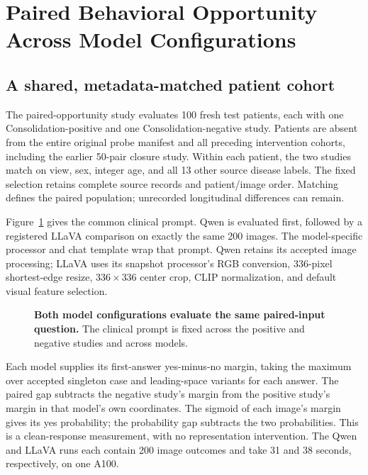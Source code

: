 \clearpage
\section{Paired Behavioral Opportunity Across Model Configurations}
\label{app:paired-opportunity}

\subsection{A shared, metadata-matched patient cohort}

The paired-opportunity study evaluates 100 fresh test patients, each with
one Consolidation-positive and one Consolidation-negative study. Patients
are absent from the entire original probe manifest and all preceding
intervention cohorts, including the earlier 50-pair closure study.
Within each patient, the two studies match on view, sex, integer age, and
all 13 other source disease labels. The fixed selection retains complete
source records and patient/image order. Matching defines the paired
population; unrecorded longitudinal differences can remain.

Figure~\ref{fig:paired-prompt} gives the common clinical prompt. Qwen is
evaluated first, followed by a registered LLaVA comparison on exactly the
same 200 images. The model-specific processor and chat template wrap that
prompt. Qwen retains its accepted image processing; LLaVA uses its snapshot
processor's RGB conversion, 336-pixel shortest-edge resize, $336\times336$
center crop, CLIP normalization, and default visual feature selection.

\begin{figure}[H]
\centering
\begin{minipage}{0.95\linewidth}
\small
{}
\end{minipage}
\caption{\textbf{Both model configurations evaluate the same paired-input question.} The clinical prompt is fixed across the positive and negative studies and across models.}
\label{fig:paired-prompt}
\end{figure}

Each model supplies its first-answer yes-minus-no margin, taking the
maximum over accepted singleton case and leading-space variants for each
answer. The paired gap subtracts the negative study's margin from the
positive study's margin in that model's own coordinates. The sigmoid of
each image's margin gives its yes probability; the probability gap
subtracts the two probabilities. This is a clean-response measurement,
with no representation intervention. The Qwen and LLaVA runs each contain
200 image outcomes and take 31 and 38 seconds, respectively, on one A100.

